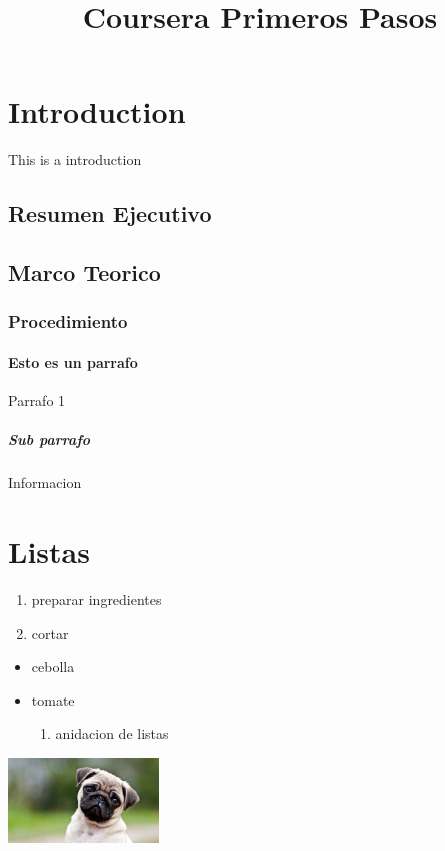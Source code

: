 \documentclass{article}
\title{Coursera Primeros Pasos}
\begin{document}
\maketitle

\newpage
\tableofcontents
\listoffigures
\listoftables

\newpage

\section{Introduction}
This is a introduction
\subsection{Resumen Ejecutivo}
\subsection{Marco Teorico}
\subsubsection{Procedimiento}
\paragraph{Esto es un parrafo}
Parrafo 1

\subparagraph{Sub parrafo}
Informacion
\section{Listas}
\begin{enumerate}
    \item preparar ingredientes
    \item  cortar
\end{enumerate}
\begin{itemize}
    \item cebolla
    \item  tomate
    \begin{enumerate}
        \item anidacion de listas
    \end{enumerate}
\end{itemize}

\includegraphics[width = 0.3\textwidth]{Perro.jpg}
\end{document}
